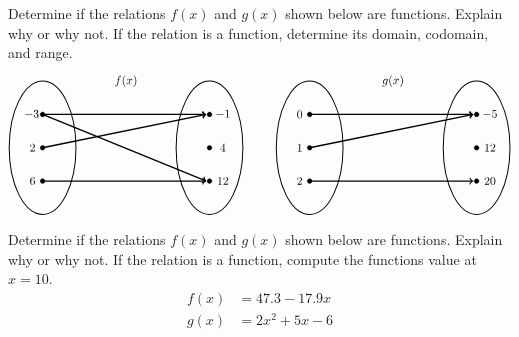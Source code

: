 \documentclass[11pt,letterpaper]{article}
\begin{document}
\prob Determine if the relations $f(x)$ and $g(x)$ shown below are functions. Explain why or why not. If the relation is a function, determine its domain, codomain, and range. 
	\[
	\begin{tikzpicture}
	\node at (2.5,2) {$f(x)$};
	\draw[line width=0.03cm] (0,0) circle (1 and 2);
	\draw[line width=0.03cm] (5,0) circle (1 and 2);
	
	\draw[fill=black] (0,1) circle (0.07);
	\draw[fill=black] (0,0) circle (0.07);
	\draw[fill=black] (0,-1) circle (0.07);
	
	\draw[fill=black] (5,1) circle (0.07);
	\draw[fill=black] (5,0) circle (0.07);
	\draw[fill=black] (5,-1) circle (0.07);
	
	\draw[line width=0.04cm,->] (0,1) -- (4.9,1);
	\draw[line width=0.04cm,->] (0,1) -- (4.9,-1);
	\draw[line width=0.04cm,->] (0,0) -- (4.9,1);
	\draw[line width=0.04cm,->] (0,-1) -- (4.9,-1);
	
	\node at (-0.3,1) {$\!-3$};
	\node at (-0.3,0) {$2$};
	\node at (-0.3,-1) {$6$};
	
	\node at (5.4,1) {$-1$};
	\node at (5.4,0) {$4$};
	\node at (5.4,-1) {$12$};
	
	\tikzset{shift={(8,0)}}
	\node at (2.5,2) {$g(x)$};
	\draw[line width=0.03cm] (0,0) circle (1 and 2);
	\draw[line width=0.03cm] (5,0) circle (1 and 2);
	
	\draw[fill=black] (0,1) circle (0.07);
	\draw[fill=black] (0,0) circle (0.07);
	\draw[fill=black] (0,-1) circle (0.07);
	
	\draw[fill=black] (5,1) circle (0.07);
	\draw[fill=black] (5,0) circle (0.07);
	\draw[fill=black] (5,-1) circle (0.07);
	
	\draw[line width=0.04cm,->] (0,1) -- (4.9,1);
	\draw[line width=0.04cm,->] (0,0) -- (4.9,1);
	\draw[line width=0.04cm,->] (0,-1) -- (4.9,-1);
	
	\node at (-0.3,1) {$0$};
	\node at (-0.3,0) {$1$};
	\node at (-0.3,-1) {$2$};
	
	\node at (5.4,1) {$-5$};
	\node at (5.4,0) {$12$};
	\node at (5.4,-1) {$20$};
	\end{tikzpicture}
	\] \pspace


\prob Determine if the relations $f(x)$ and $g(x)$ shown below are functions. Explain why or why not. If the relation is a function, compute the functions value at $x= 10$. 
	\[
	\begin{aligned}
	f(x)&= 47.3 - 17.9x \\[0.3cm]
	g(x)&= 2x^2 + 5x - 6
	\end{aligned}
	\] \pspace
\end{document}
